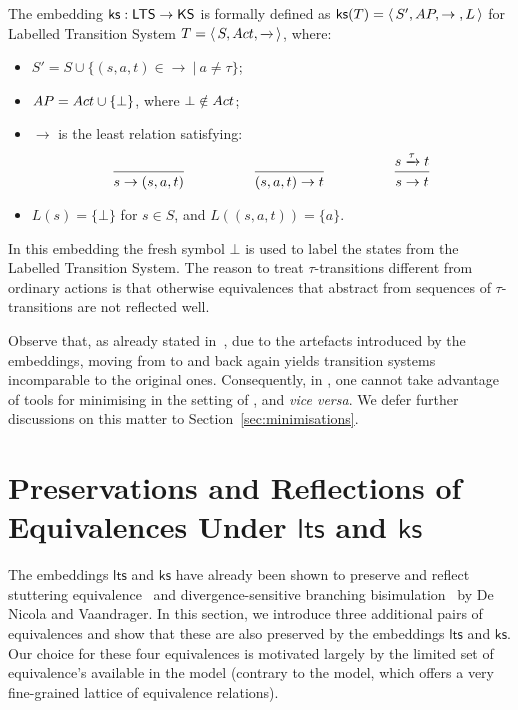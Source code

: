 \documentclass{llncs}
\newcommand{\sosrule}[2]{\frac{\raisebox{.7ex}{\normalsize{$#1$}}}
                        {\raisebox{-1.0ex}{\normalsize{$#2$}}}}
\newcommand{\ltstrans}[1]{\xrightarrow{#1}}
\newcommand{\kstrans}{\to}
\newcommand{\lts}{\mathsf{lts}}
\newcommand{\ks}{\mathsf{ks}}
\begin{document}
\begin{definition}
\label{translationks}
The embedding $\ks : \LTS \to \KS$ is formally defined as
$\ks(T) = \tuple{S', \AP, \kstrans{}, L}$ for Labelled Transition
System $T = \tuple{S, \act, \ltstrans{}}$, where:
\begin{itemize}
\item $S' = S \cup \{ (s,a,t) \in \ltstrans{} ~|~ a \not=\tau \}$;
\item $AP = Act \cup \{\bot\}$, where $\bot \notin Act$;
\item $\kstrans$ is the least relation satisfying:
$$
\begin{array}{cp{1cm}cp{1cm}c}
\sosrule{}{s \kstrans (s,a,t)}
&
&
\sosrule{}{(s,a,t) \kstrans t}
&
&
\sosrule{s \ltstrans{\tau} t}{s \kstrans t}
\end{array}
$$
\item $L(s) = \{\bot\}$ for $s \in S$, and $L((s,a,t)) = \{a\}$.
\end{itemize}
\end{definition}
In this embedding the fresh symbol $\bot$ is used to label the states from the Labelled Transition System.
The reason to treat $\tau$-transitions different from ordinary actions is that otherwise equivalences that abstract from sequences of $\tau$-transitions are not reflected well.

Observe that, as already stated in~\cite{DBLP:conf/litp/NicolaV90},
due to the artefacts introduced by the embeddings, moving from \LTS
to \KS and back again yields transition systems incomparable to the
original ones. Consequently, in \LTS, one cannot take advantage of tools
for minimising in the setting of \KS, and \emph{vice versa}. We defer
further discussions on this matter to Section~\ref{sec:minimisations}.

\section{Preservations and Reflections of Equivalences Under $\lts$ and $\ks$}
\label{Sect:preservations}

The embeddings $\lts$ and $\ks$ have already been shown to preserve and
reflect stuttering equivalence~\cite{DBLP:journals/tcs/BrowneCG88} and divergence-sensitive
branching bisimulation~\cite{vanGlabbeek96} by De Nicola and Vaandrager. In this
section, we introduce three additional pairs of equivalences and show
that these are also preserved by the embeddings $\lts$ and $\ks$. Our
choice for these four equivalences is motivated largely by the limited
set of equivalence's available in the \KS model (contrary to the \LTS model,
which offers a very fine-grained lattice of equivalence relations).
\end{document}
